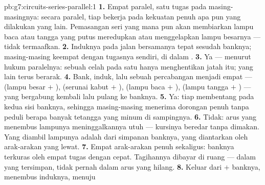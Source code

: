 \begin{solution}{pb:g7:circuits-series-parallel:1}
\textbf{1.} Empat  paralel, satu tugas pada masing-masingnya:
secara paralel, tiap  bekerja pada kekuatan penuh apa pun yang
dilakukan  yang lain. Pemasangan seri yang mana pun akan
membiarkan  lampu baca atau  tangga yang putus
meredupkan atau menggelapkan lampu besarnya --- tidak termaafkan.
\textbf{2.} Induknya pada jalan bersamanya tepat sesudah banknya;
masing-masing keempat    dengan tugasnya
sendiri, di dalam .
\textbf{3.} Ya --- menurut hukum paralelnya: sebuah celah pada satu
 hanya menghentikan jatah  itu; yang lain terus berarak.
\textbf{4.} Bank,  induk, lalu sebuah percabangan menjadi empat
 --- (lampu besar $+$ ), (serunai kabut $+$ ),
(lampu baca $+$ ), (lampu tangga $+$ ) --- yang bergabung
kembali lalu pulang ke banknya.
\textbf{5.} Ya: tiap  membentang pada kedua sisi banknya,
sehingga masing-masing menerima dorongan penuh tanpa peduli berapa
banyak tetangga yang minum di sampingnya.
\textbf{6.} Tidak: arus yang menembus lampunya meninggalkannya utuh
--- kursinya beredar tanpa dimakan. Yang diambil lampunya adalah
 dari simpanan banknya, yang diantarkan oleh arak-arakan yang
lewat.
\textbf{7.} Empat arak-arakan penuh sekaligus:  banknya terkuras
oleh empat tugas dengan cepat. Tagihannya dibayar di ruang 
--- dalam  yang tersimpan, tidak pernah dalam arus yang hilang.
\textbf{8.} Keluar dari $+$ banknya, menembus  induknya, menuju

\end{solution}
